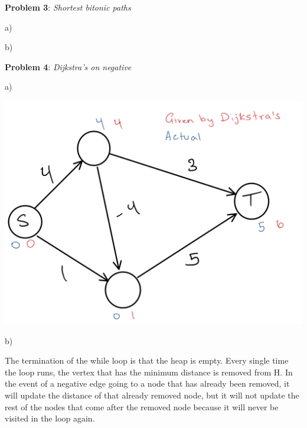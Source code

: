 \documentclass{article} %
\newcommand{\question}[2][]{\begin{flushleft}
        \textbf{Problem #1}: \textit{#2}

\end{flushleft}}
\begin{document}
    \newpage

    \question[3]{Shortest bitonic paths}

    a)

    b)


    
    \newpage

    \question[4]{Dijkstra's on negative}

    a)

    \includegraphics[scale=0.2]{s.jpeg}

    b)

    The termination of the while loop is that the heap is empty. Every single time the loop runs, the vertex that has the minimum distance is removed from H. In the event of a negative edge going to a node that has already been removed, it will update the distance of that already removed node, but it will not update the rest of the nodes that come after the removed node because it will never be visited in the loop again.
\end{document}
